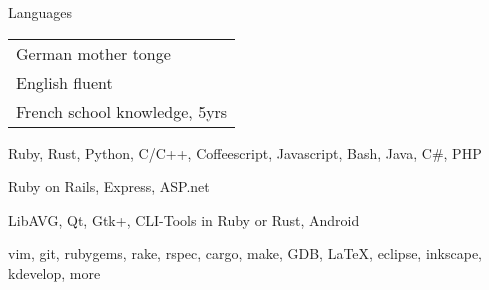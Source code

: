 \begin{cvskills}
  \cvskill
  {Languages}
  {\def\arraystretch{1}
    \begin{tabular}[]{l}
      German \hspace{4.9mm} mother tonge \\
      English \hspace{6mm} fluent \\
      French \hspace{6.6mm} school knowledge, 5yrs
    \end{tabular}
    \def\arraystretch{1.2}
  }
  {Ruby, Rust, Python, C/C++, Coffeescript, Javascript, Bash, Java, C\#, PHP}

  {Ruby on Rails, Express, ASP.net}

  {LibAVG, Qt, Gtk+, CLI-Tools in Ruby or Rust, Android}

  {vim, git, rubygems, rake, rspec, cargo, make, GDB, LaTeX, eclipse, inkscape, kdevelop, more}
\end{cvskills}
